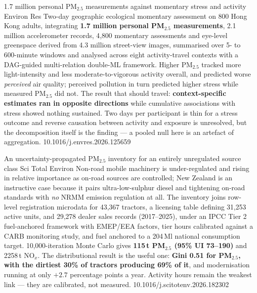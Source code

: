 \documentclass[10pt]{article}
\begin{document}

{1.7 million personal PM$_{2.5}$ measurements against momentary stress and activity}
{Environ Res}
{Two-day geographic ecological momentary assessment on 800 Hong Kong adults, integrating
\textbf{1.7 million personal PM$_{2.5}$ measurements}, 2.1 million accelerometer records,
4{,}800 momentary assessments and eye-level greenspace derived from 4.3 million
street-view images, summarised over 5- to 600-minute windows and analysed across eight
activity-travel contexts with a DAG-guided multi-relation double-ML framework. Higher
PM$_{2.5}$ tracked more light-intensity and less moderate-to-vigorous activity overall,
and predicted worse \emph{perceived} air quality; perceived pollution in turn predicted
higher stress while measured PM$_{2.5}$ did not. The result that should travel:
\textbf{context-specific estimates ran in opposite directions} while cumulative
associations with stress showed nothing sustained. Two days per participant is thin for a
stress outcome and reverse causation between activity and exposure is unresolved, but the
decomposition itself is the finding --- a pooled null here is an artefact of aggregation.}
{10.1016/j.envres.2026.125659}

{An uncertainty-propagated PM$_{2.5}$ inventory for an entirely unregulated source class}
{Sci Total Environ}
{Non-road mobile machinery is under-regulated and rising in relative importance as on-road
sources are controlled; New Zealand is an instructive case because it pairs ultra-low-sulphur
diesel and tightening on-road standards with \emph{no} NRMM emission regulation at all. The
inventory joins row-level registration microdata for 43{,}367 tractors, a licensing table
defining 31{,}253 active units, and 29{,}278 dealer sales records (2017--2025), under an
IPCC Tier 2 fuel-anchored framework with EMEP/EEA factors, tier hours calibrated against a
CARB monitoring study, and fuel anchored to a 204\,Ml national consumption target.
10{,}000-iteration Monte Carlo gives \textbf{115\,t PM$_{2.5}$ (95\% UI 73--190)} and
2258\,t NO$_x$. The distributional result is the useful one: \textbf{Gini 0.51 for
PM$_{2.5}$, with the dirtiest 30\% of tractors producing 69\% of it}, and modernisation
running at only $+2.7$ percentage points a year. Activity hours remain the weakest link ---
they are calibrated, not measured.}
{10.1016/j.scitotenv.2026.182302}
\end{document}
